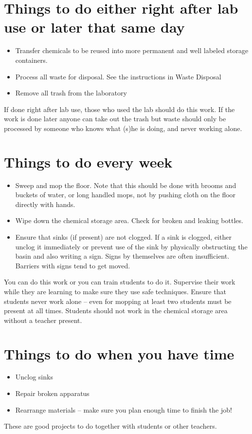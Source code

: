 \section{Things to do either right after lab use or later that same day}
\begin{itemize}
\item{Transfer chemicals to be reused into more permanent 
and well labeled storage containers.}
\item{Process all waste for disposal. 
See the instructions in Waste Disposal}
\item{Remove all trash from the laboratory}
\end{itemize}
If done right after lab use, 
those who used the lab should do this work. 
If the work is done later 
anyone can take out the trash 
but waste should only be processed 
by someone who knows what (s)he is doing, 
and never working alone.

\section{Things to do every week}
\begin{itemize}
\item{Sweep and mop the floor. 
Note that this should be done with brooms and buckets of water, 
or long handled mops, 
not by pushing cloth on the floor directly with hands.}
\item{Wipe down the chemical storage area. 
Check for broken and leaking bottles.}
\item{Ensure that sinks (if present) are not clogged. 
If a sink is clogged, 
either unclog it immediately or prevent use of the sink 
by physically obstructing the basin and also writing a sign. 
Signs by themselves are often insufficient. 
Barriers with signs tend to get moved.}
\end{itemize}
You can do this work or you can train students to do it. 
Supervise their work while they are learning 
to make sure they use safe techniques. 
Ensure that students never work alone – 
even for mopping at least two students must be present at all times. 
Students should not work in the chemical storage area 
without a teacher present.

\section{Things to do when you have time}
\begin{itemize}
\item{Unclog sinks}
\item{Repair broken apparatus}
\item{Rearrange materials – 
make sure you plan enough time to finish the job!}
\end{itemize}
These are good projects to do together with students or other teachers.
